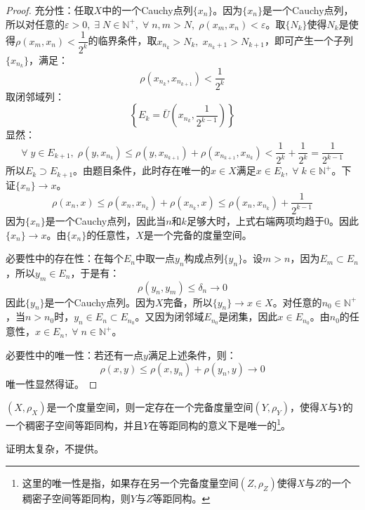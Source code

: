 \begin{proof}
	充分性：任取$X$中的一个Cauchy点列$\{x_n\}$。因为$\{x_n\}$是一个Cauchy点列，所以对任意的$\varepsilon>0,\;\exists\;N\in\mathbb{N}^+,\;\forall\;n,m>N,\;\rho(x_m,x_n)<\varepsilon$。取$\{N_k\}$使得$N_k$是使得$\rho(x_m,x_n)<\dfrac{1}{2^k}$的临界条件，取$x_{n_k}>N_k,\;x_{n_k+1}>N_{k+1}$，即可产生一个子列 $\{x_{n_k}\}$，满足：
	\begin{equation*}
		\rho(x_{n_k},x_{n_{k+1}})<\frac{1}{2^k}
	\end{equation*}
	取闭邻域列：
	\begin{equation*}
		\left\{E_k=\bar{U}\left(x_{n_k},\frac{1}{2^{k-1}}\right)\right\}
	\end{equation*}
	显然：
	\begin{equation*}
		\forall\;y\in E_{k+1},\;\rho(y,x_{n_k})\leqslant\rho(y,x_{n_{k+1}})+\rho(x_{n_{k+1}},x_{n_k})<\frac{1}{2^k}+\frac{1}{2^k}=\frac{1}{2^{k-1}}
	\end{equation*}
	所以$E_k\supset E_{k+1}$。由题目条件，此时存在唯一的$x\in X$满足$x\in E_k,\;\forall\;k\in\mathbb{N}^+$。下证$\{x_n\}\to x$。
	\begin{equation*}
		\rho(x_n,x)\leqslant\rho(x_n,x_{n_k})+\rho(x_{n_k},x)\leqslant\rho(x_n,x_{n_k})+\frac{1}{2^{k-1}}
	\end{equation*}
	因为$\{x_n\}$是一个Cauchy点列，因此当$n$和$k$足够大时，上式右端两项均趋于$0$。因此$\{x_n\}\to x$。由$\{x_n\}$的任意性，$X$是一个完备的度量空间。\par
	必要性中的存在性：在每个$E_n$中取一点$y_n$构成点列$\{y_n\}$。设$m>n$，因为$E_m\subset E_n$，所以$y_m\in E_n$，于是有：
	\begin{equation*}
		\rho(y_n,y_m)\leqslant\delta_n\to0
	\end{equation*}
	因此$\{y_n\}$是一个Cauchy点列。因为$X$完备，所以$\{y_n\}\to x\in X$。对任意的$n_0\in\mathbb{N}^+$，当$n>n_0$时，$y_n\in E_n\subset E_{n_0}$。又因为闭邻域$E_{n_0}$是闭集，因此$x\in E_{n_0}$。由$n_0$的任意性，$x\in E_n,\;\forall\;n\in\mathbb{N}^+$。\par
	必要性中的唯一性：若还有一点$y$满足上述条件，则：
	\begin{equation*}
		\rho(x,y)\leqslant\rho(x,y_n)+\rho(y_n,y)\to0
	\end{equation*}
	唯一性显然得证。
\end{proof}
\begin{theorem}
	$(X,\rho_X)$是一个度量空间，则一定存在一个完备度量空间$(Y,\rho_Y)$，使得$X$与$Y$的一个稠密子空间等距同构，并且$Y$在等距同构的意义下是唯一的\footnote{这里的唯一性是指，如果存在另一个完备度量空间$(Z,\rho_Z)$使得$X$与$Z$的一个稠密子空间等距同构，则$Y$与$Z$等距同构。}。
\end{theorem}
证明太复杂，不提供。